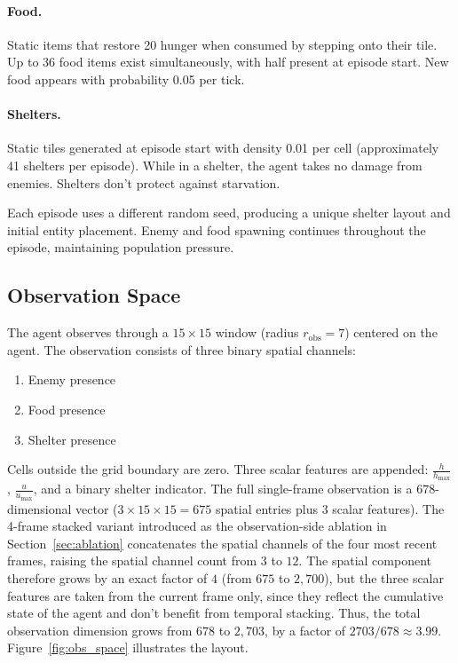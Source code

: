\documentclass[12pt,a4paper,titlepage]{article}
\begin{document}
\paragraph{Food.} Static items that restore 20 hunger when consumed by stepping onto their tile. Up to 36 food items exist simultaneously, with half present at episode start. New food appears with probability 0.05 per tick.

\paragraph{Shelters.} Static tiles generated at episode start with density 0.01 per cell (approximately 41 shelters per episode). While in a shelter, the agent takes no damage from enemies. Shelters don't protect against starvation.

Each episode uses a different random seed, producing a unique shelter layout and initial entity placement. Enemy and food spawning continues throughout the episode, maintaining population pressure.

\subsection{Observation Space}

The agent observes through a $15 \times 15$ window (radius $r_\text{obs} = 7$) centered on the agent. The observation consists of three binary spatial channels:
\begin{enumerate}[nosep]
\item Enemy presence
\item Food presence
\item Shelter presence
\end{enumerate}
Cells outside the grid boundary are zero. Three scalar features are appended: $\frac{h}{h_\text{max}}$, $\frac{u}{u_\text{max}}$, and a binary shelter indicator. The full single-frame observation is a $678$-dimensional vector ($3 \times 15 \times 15 = 675$ spatial entries plus $3$ scalar features). The 4-frame stacked variant introduced as the observation-side ablation in Section~\ref{sec:ablation} concatenates the spatial channels of the four most recent frames, raising the spatial channel count from $3$ to $12$. The spatial component therefore grows by an exact factor of $4$ (from $675$ to $2{,}700$), but the three scalar features are taken from the current frame only, since they reflect the cumulative state of the agent and don't benefit from temporal stacking. Thus, the total observation dimension grows from $678$ to $2{,}703$, by a factor of $2703 / 678 \approx 3.99$. Figure~\ref{fig:obs_space} illustrates the layout.
\end{document}
